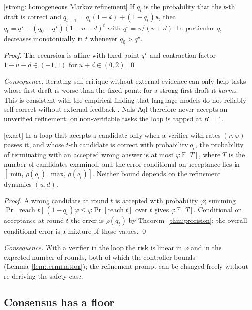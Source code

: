\begin{theorem}
\textnormal{[strong: homogeneous Markov refinement]}
\label{thm:selfrefine}
If $q_t$ is the probability that the $t$-th draft is correct and
$q_{t+1}=q_t(1-d)+(1-q_t)u$, then
$q_t=q^\star+(q_0-q^\star)(1-u-d)^t$ with $q^\star=u/(u+d)$. In particular
$q_t$ decreases monotonically in $t$ whenever $q_0>q^\star$.
\end{theorem}
\begin{proof}
The recursion is affine with fixed point $q^\star$ and contraction factor
$1-u-d\in(-1,1)$ for $u+d\in(0,2)$. \qed
\end{proof}
\emph{Consequence.} Iterating self-critique without external evidence can only
help tasks whose first draft is worse than the fixed point; for a strong first
draft it \emph{harms}. This is consistent with the empirical finding that
language models do not reliably self-correct without external feedback
\cite{huang2024selfcorrect,kamoi2024survey}. Nafs-Aql therefore never accepts an
unverified refinement: on non-verifiable tasks the loop is capped at $R=1$.

\begin{theorem} \textnormal{[exact]}
\label{thm:gatedloop}
In a loop that accepts a candidate only when a verifier with rates
$(r,\varphi)$ passes it, and whose $t$-th candidate is correct with
probability $q_t$, the probability of terminating with an accepted wrong answer
is at most $\varphi\,\mathbb E[T]$, where $T$ is the number of candidates
examined, and the error conditional on acceptance lies in
$[\min_t\rho(q_t),\max_t\rho(q_t)]$. Neither bound depends on the refinement
dynamics $(u,d)$.
\end{theorem}
\begin{proof}
A wrong candidate at round $t$ is accepted with probability $\varphi$;
summing $\Pr[\text{reach }t]\,(1-q_t)\varphi\le\varphi\Pr[\text{reach }t]$
over $t$ gives $\varphi\,\mathbb E[T]$. Conditional on acceptance at round $t$
the error is $\rho(q_t)$ by Theorem~\ref{thm:precision}; the overall
conditional error is a mixture of these values. \qed
\end{proof}
\emph{Consequence.} With a verifier in the loop the risk is linear in
$\varphi$ and in the expected number of rounds, both of which the controller
bounds (Lemma~\ref{lem:termination}); the refinement prompt can be changed
freely without re-deriving the safety case.

\subsection{Consensus has a floor}

